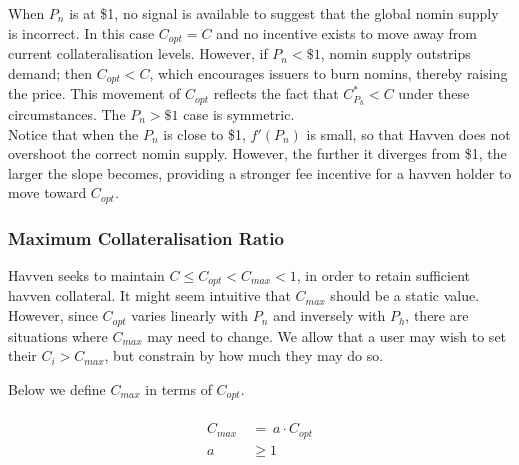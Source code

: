 \noindent When \(P_n\) is at \$1, no signal is available to suggest that
the global nomin supply is incorrect.
In this case \(C_{opt} = C\) and no incentive exists to move away
from current collateralisation levels.
However, if \(P_n < \$1\), nomin supply outstrips demand; then \(C_{opt} < C\),
which encourages issuers to burn nomins, thereby raising the price. 
This movement of \(C_{opt}\) reflects the fact that \(C^*_{P_h} < C\)
under these circumstances. The \(P_n > \$1\) case is symmetric. \\

\noindent Notice that when the \(P_n\) is close to \$1, \( f'(P_n) \) is small,
so that Havven does not overshoot the correct nomin supply. However, the further it
diverges from \$1, the larger the slope becomes, providing a stronger fee
incentive for a havven holder to move toward
\(C_{opt}\). \\


\subsubsection{Maximum Collateralisation Ratio}

\noindent Havven seeks to maintain \(C \leq C_{opt} < C_{max} < 1\), in order
to retain sufficient havven collateral. It might seem intuitive that
\(C_{max}\) should be a static value. However, since \(C_{opt}\) varies linearly
with \(P_n\) and inversely with \(P_h\), there are situations where \(C_{max}\) may
need to change. We allow that a user may wish to set their \(C_i > C_{max}\), but
constrain by how much they may do so.

\noindent Below we define \(C_{max}\) in terms of \(C_{opt}\).

\begin{gather} \label{eq:maxcollateralisation}
\begin{align}
\begin{split}
C_{max} \ &= \ a \cdot C_{opt} \\ 
a & \geq 1 \\
\end{split}
\end{align}
\end{gather}


